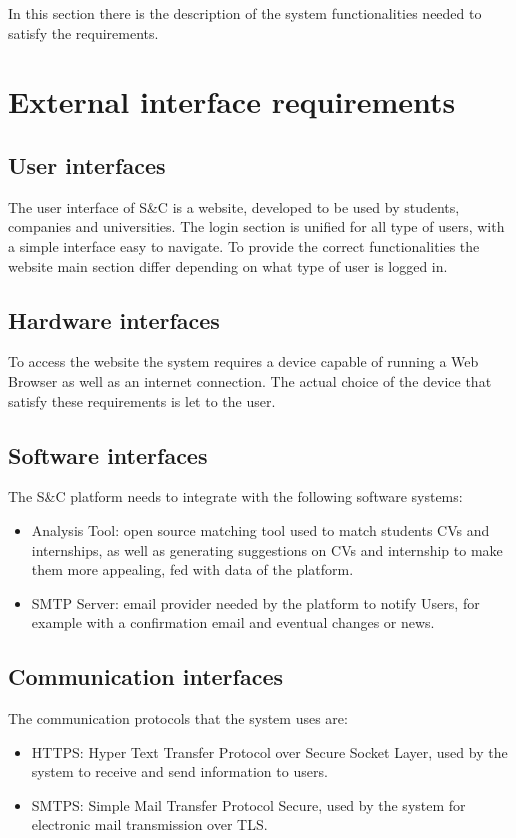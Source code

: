 In this section there is the description of the system functionalities needed to satisfy the requirements.

\section{External interface requirements}\label{sec:external-interface-requirements}
\subsection{User interfaces}\label{subsec:user-interfaces}
The user interface of S\&C is a website, developed to be used by students, companies and universities.
The login section is unified for all type of users, with a simple interface easy to navigate.
To provide the correct functionalities the website main section differ depending on what type of user is logged in.
\subsection{Hardware interfaces}\label{subsec:hardware-interfaces}
To access the website the system requires a device capable of running a Web Browser as well as an internet connection.
The actual choice of the device that satisfy these requirements is let to the user.
\subsection{Software interfaces}\label{subsec:software-interfaces}
The S\&C platform needs to integrate with the following software systems:
\begin{itemize}
    \item Analysis Tool: open source matching tool used to match students CVs and internships, as well as generating suggestions on CVs and internship to make them more appealing, fed with data of the platform.
    \item SMTP Server: email provider needed by the platform to notify Users, for example with a confirmation email and eventual changes or news.
\end{itemize}
\subsection{Communication interfaces}\label{subsec:communication-interfaces}
The communication protocols that the system uses are:
\begin{itemize}
    \item HTTPS: Hyper Text Transfer Protocol over Secure Socket Layer, used by the system to receive and send information to users.
    \item SMTPS: Simple Mail Transfer Protocol Secure, used by the system for electronic mail transmission over TLS.

\end{itemize}

